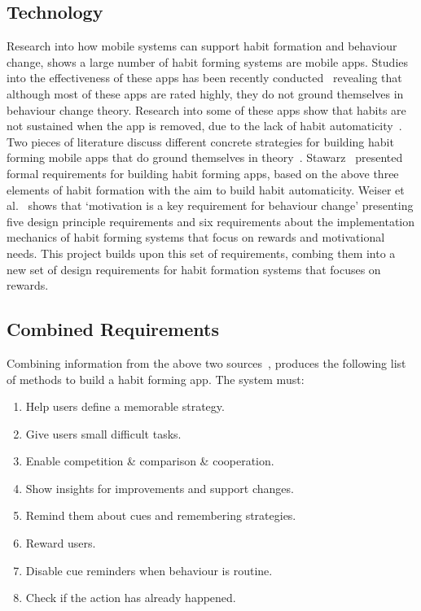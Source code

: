 \subsection{Technology}
Research into how mobile systems can support habit formation and behaviour change, shows a large number of habit forming systems are mobile apps. Studies into the effectiveness of these apps has been recently conducted~\cite{article_beyond_self_tracking_designing_apps, article_dont_kick_habit} revealing that although most of these apps are rated highly, they do not ground themselves in behaviour change theory. Research into some of these apps show that habits are not sustained when the app is removed, due to the lack of habit automaticity~\cite{article_beyond_self_tracking_designing_apps}.\newline
\newline
Two pieces of literature discuss different concrete strategies for building habit forming mobile apps that do ground themselves in theory~\cite{thesis_kathy, article_taxonomy_motivational_affordances_meaningful}. Stawarz~\cite{thesis_kathy} presented formal requirements for building habit forming apps, based on the above three elements of habit formation with the aim to build habit automaticity. Weiser et al.~\cite{article_taxonomy_motivational_affordances_meaningful} shows that `motivation is a key requirement for behaviour change' presenting five design principle requirements and six requirements about the implementation mechanics of habit forming systems that focus on rewards and motivational needs. This project builds upon this set of requirements, combing them into a new set of design requirements for habit formation systems that focuses on rewards.

\subsection{Combined Requirements}
Combining information from the above two sources~\cite{thesis_kathy, article_taxonomy_motivational_affordances_meaningful}, produces the following list of methods to build a habit forming app.\newline
\newline
The system must:

\begin{enumerate}
    \item Help users define a memorable strategy.
    \item Give users small difficult tasks.
    \item Enable competition \& comparison \& cooperation.
    \item Show insights for improvements and support changes.
    \item Remind them about cues and remembering strategies.
    \item Reward users.
    \item Disable cue reminders when behaviour is routine.
    \item Check if the action has already happened.
\end{enumerate}

